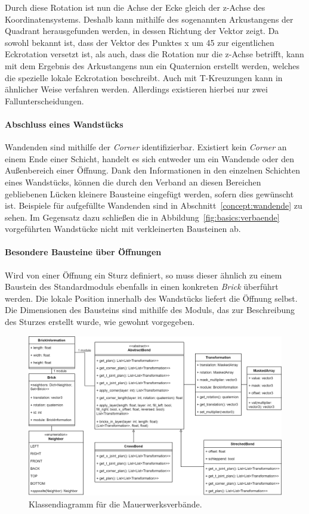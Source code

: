 Durch diese Rotation ist nun die Achse der Ecke gleich der z-Achse des Koordinatensystems.
Deshalb kann mithilfe des sogenannten Arkustangens der Quadrant herausgefunden werden, in dessen Richtung der Vektor zeigt.
Da sowohl bekannt ist, dass der Vektor des Punktes x um 45\degree{} zur eigentlichen Eckrotation versetzt ist, als auch, dass die Rotation nur die z-Achse betrifft, kann mit dem Ergebnis des Arkustangens nun ein Quaternion erstellt werden, welches die spezielle lokale Eckrotation beschreibt.
Auch mit T-Kreuzungen kann in ähnlicher Weise verfahren werden. 
Allerdings existieren hierbei nur zwei Fallunterscheidungen.

\paragraph*{Abschluss eines Wandstücks} Wandenden sind mithilfe der \textit{Corner} identifizierbar.
Existiert kein \textit{Corner} an einem Ende einer Schicht, handelt es sich entweder um ein Wandende oder den Außenbereich einer Öffnung.
Dank den Informationen in den einzelnen Schichten eines Wandstücks, können die durch den Verband an diesen Bereichen gebliebenen Lücken kleinere Bausteine eingefügt werden, sofern dies gewünscht ist.
Beispiele für aufgefüllte Wandenden sind in Abschnitt~\ref{concept:wandende} zu sehen.
Im Gegensatz dazu schließen die in Abbildung~\ref{fig:basics:verbaende} vorgeführten Wandstücke nicht mit verkleinerten Bausteinen ab.

\paragraph*{Besondere Bausteine über Öffnungen} Wird von einer Öffnung ein Sturz definiert, so muss dieser ähnlich zu einem Baustein des Standardmoduls ebenfalls in einen konkreten \textit{Brick} überführt werden.
Die lokale Position innerhalb des Wandstücks liefert die Öffnung selbst.
Die Dimensionen des Bausteins sind mithilfe des Moduls, das zur Beschreibung des Sturzes erstellt wurde, wie gewohnt vorgegeben.

\begin{figure}[hb]
  \centering
  \includegraphics[width=0.9\columnwidth]{fig/klassendiagramm_bonds.drawio.png}
  \caption{Klassendiagramm für die Mauerwerksverbände.}\label{fig:real:class_diagram_bonds}
\end{figure}

